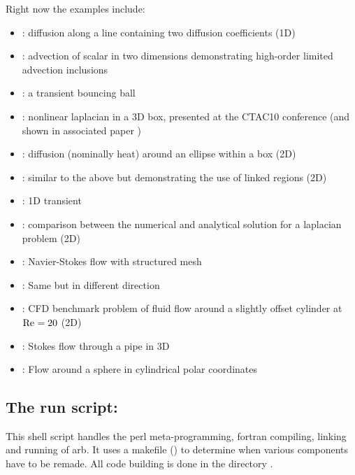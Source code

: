 Right now the examples include:
\begin{itemize}
\item {}: diffusion along a line containing two diffusion coefficients (1D)
\item {}: advection of scalar in two dimensions demonstrating high-order limited advection inclusions
\item {}: a transient bouncing ball
\item {}: nonlinear laplacian in a 3D box, presented at the CTAC10 conference (and shown in associated paper \cite{dhctac10})
\item {}: diffusion (nominally heat) around an ellipse within a box (2D)
\item {}: similar to the above but demonstrating the use of linked regions (2D)
\item {}: 1D transient
\item {}: comparison between the numerical and analytical solution for a laplacian problem (2D)
\item {}: Navier-Stokes flow with structured mesh
\item {}: Same but in different direction
\item {}: CFD benchmark problem of fluid flow around a slightly offset cylinder at $\mbox{Re}_\mathrm{}=20$ (2D)
\item {}: Stokes flow through a pipe in 3D
\item {}: Flow around a sphere in cylindrical polar coordinates
\end{itemize}

\subsection{The  run script:}

This shell script handles the perl meta-programming, fortran compiling, linking and running of arb.  It uses a makefile () to determine when various components have to be remade.  All code building is done in the directory .

